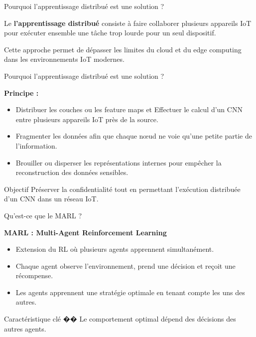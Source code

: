 \documentclass{beamer}
\begin{document}
\begin{frame}{Pourquoi l’apprentissage distribué est une solution ?}

Le \textbf{l’apprentissage distribué } consiste à faire collaborer plusieurs appareils IoT 
pour exécuter ensemble une tâche trop lourde pour un seul dispositif.

\vspace{0.3cm}
Cette approche permet de dépasser les limites du cloud et du edge computing 
dans les environnements IoT modernes.

\end{frame}

\begin{frame}{Pourquoi l’apprentissage distribué est une solution ?}

\textbf{Principe :}
\begin{itemize}
    \item Distribuer les couches ou les feature maps et Effectuer le calcul d'un CNN entre plusieurs appareils IoT près de la source.
    \item Fragmenter les données afin que chaque nœud ne voie qu'une petite partie de l'information.
    \item Brouiller ou disperser les représentations internes pour empêcher la reconstruction des données sensibles.
\end{itemize}

\begin{block}{Objectif}
Préserver la confidentialité tout en permettant l'exécution distribuée d'un CNN dans un réseau IoT.
\end{block}

\end{frame}

\begin{frame}{Qu'est-ce que le MARL ?}

\textbf{MARL : Multi-Agent Reinforcement Learning}

\begin{itemize}
    \item Extension du RL où plusieurs agents apprennent simultanément.
    \item Chaque agent observe l'environnement, prend une décision
    et reçoit une récompense.
    \item Les agents apprennent une stratégie optimale en tenant compte
    les uns des autres.
\end{itemize}

\begin{block}{Caractéristique clé}
�� Le comportement optimal dépend des décisions des autres agents.
\end{block}

\end{frame}
\end{document}
